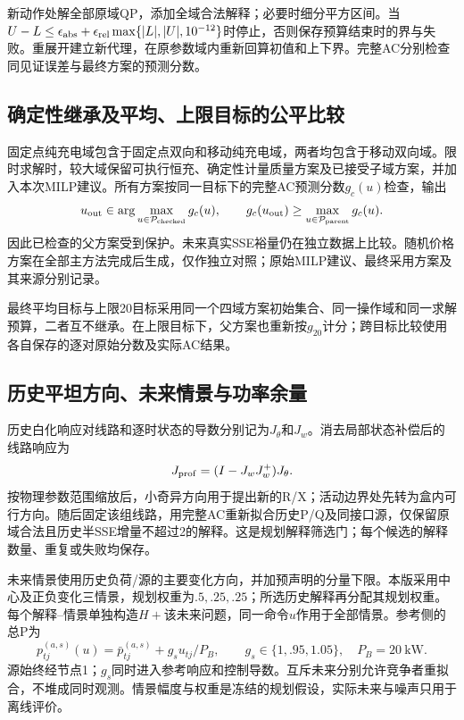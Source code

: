 \documentclass[UTF8,fontset=fandol,11pt,a4paper]{ctexart}
\begin{document}
新动作处解全部原域QP，添加全域合法解释；必要时细分平方区间。当
$U-L\le\epsilon_{\rm abs}+\epsilon_{\rm rel}\max\{|L|,|U|,10^{-12}\}$时停止，否则保存预算结束时的界与失败。重展开建立新代理，在原参数域内重新回算初值和上下界。完整AC分别检查同见证误差与最终方案的预测分数。

\subsection{确定性继承及平均、上限目标的公平比较}
固定点纯充电域包含于固定点双向和移动纯充电域，两者均包含于移动双向域。限时求解时，较大域保留可执行恒充、确定性计量质量方案及已接受子域方案，并加入本次MILP建议。所有方案按同一目标下的完整AC预测分数$g_c(u)$检查，输出
\begin{equation}
 u_{\rm out}\in\arg\max_{u\in\mathcal P_{\rm checked}}g_c(u),\qquad
 g_c(u_{\rm out})\ge\max_{u\in\mathcal P_{\rm parent}}g_c(u).
 \label{eq:compact-inheritance}
\end{equation}
因此已检查的父方案受到保护。未来真实SSE裕量仍在独立数据上比较。随机价格方案在全部主方法完成后生成，仅作独立对照；原始MILP建议、最终采用方案及其来源分别记录。

最终平均目标与上限20目标采用同一个四域方案初始集合、同一操作域和同一求解预算，二者互不继承。在上限目标下，父方案也重新按$g_{20}$计分；跨目标比较使用各自保存的逐对原始分数及实际AC结果。

\subsection{历史平坦方向、未来情景与功率余量}
历史白化响应对线路和逐时状态的导数分别记为$J_{\theta}$和$J_w$。消去局部状态补偿后的线路响应为
\begin{equation}
 J_{\rm prof}=(I-J_wJ_w^+)J_{\theta}.
 \label{eq:compact-history-profile}
\end{equation}
按物理参数范围缩放后，小奇异方向用于提出新的R/X；活动边界处先转为盒内可行方向。随后固定该组线路，用完整AC重新拟合历史P/Q及同接口源，仅保留原域合法且历史半SSE增量不超过2的解释。这是规划解释筛选门；每个候选的解释数量、重复或失败均保存。

未来情景使用历史负荷/源的主要变化方向，并加预声明的分量下限。本版采用中心及正负变化三情景，规划权重为$.5,.25,.25$；所选历史解释再分配其规划权重。每个解释--情景单独构造$H+$该未来问题，同一命令$u$作用于全部情景。参考侧的总P为
\begin{equation}
 p^{(a,s)}_{tj}(u)=\bar p^{(a,s)}_{tj}
                   +g_su_{tj}/P_B,\qquad
 g_s\in\{1,.95,1.05\},\quad P_B=20\ \mathrm{kW}.
 \label{eq:compact-tracking}
\end{equation}
源始终经节点1；$g_s$同时进入参考响应和控制导数。互斥未来分别允许竞争者重拟合，不堆成同时观测。情景幅度与权重是冻结的规划假设，实际未来与噪声只用于离线评价。
\end{document}
